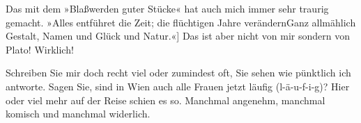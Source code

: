 \pstart
           {\pb}Das mit dem »Blaßwerden guter
               Stücke« hat auch mich immer sehr traurig gemacht.\pend
           \stanza{}»Alles entführet die Zeit; die
                     flüchtigen Jahre verändern\newverse{}Ganz allmählich Gestalt, Namen
                     und Glück und Natur.\pwindex{Epigramme@\emph{Epigramme}|pwv}{[}«{]}\stanzaend{}
\pstart
           Das ist aber nicht von mir sondern von Plato!
               Wirklich!\pend
           
\pstart
           Schreiben Sie mir doch recht viel oder zumindest oft, Sie sehen wie pünktlich ich
               antworte. Sagen Sie, sind in Wien auch alle Frauen
               jetzt läufig (l-ä-u-f-i-g)? {\pb}Hier
                   oder viel mehr auf der Reise schien es so.
               Manchmal angenehm, manchmal komisch und manchmal widerlich.\pend
           
